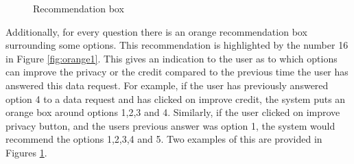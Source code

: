 \begin{figure}[htp]
  \hspace{1em}
  \caption{Recommendation box}
  \label{fig:orange}
\end{figure}

Additionally, for every question there is an orange recommendation box surrounding some options. This recommendation is highlighted by the number 16 in Figure \ref{fig:orange1}.
This gives an indication to the user as to which options can improve the privacy or the credit compared to the previous time the user has
answered this data request. For example, if the user has previously answered option 4 to a data request and has clicked on improve credit, the system
puts an orange box around options 1,2,3 and 4. Similarly, if the user clicked on improve privacy button, and the users previous answer was option 1, the system would recommend the options 1,2,3,4 and 5. Two examples of this are provided in Figures \ref{fig:orange}. 

